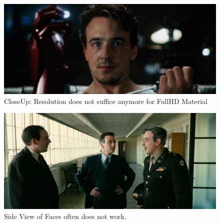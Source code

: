 \documentclass[
  a4paper,  %
  twoside,  %
  bibliography=totoc,
  headsepline,
  cleardoublepage=empty,
  parskip=half,
  draft=false
]{scrbook}
\begin{document}
\begin{figure}[h]
  \centering
  \includegraphics[width=1\textwidth]{./graphics/inswapper/iron-man-too-close.png}
  \caption{CloseUp: Resolution does not suffice anymore for FullHD Material}
\end{figure}
\begin{figure}[h]
  \centering
  \includegraphics[width=1\textwidth]{./graphics/inswapper/oppenheimer1.png}
  \caption{Side View of Faces often does not work.}
\end{figure}
\end{document}
